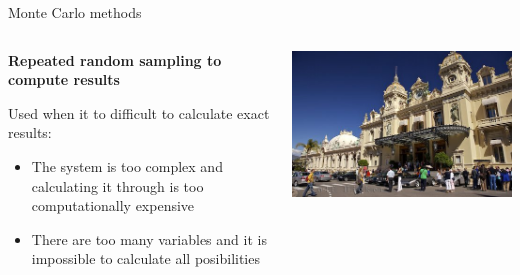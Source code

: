 \documentclass[compress]{beamer}
\begin{document}
\begin{frame}{Monte Carlo methods}

    \begin{columns}
        \begin{column}{0.5\linewidth}
            \textbf{Repeated random sampling to compute results}

            Used when it to difficult to calculate exact results:

            \begin{itemize}
                \item The system is too complex and calculating it through is too
                    computationally expensive
                \item There are too many variables and it is impossible to calculate all
                    posibilities
            \end{itemize}


        \end{column}
        \begin{column}{0.5\linewidth}
            \begin{center}
                \includegraphics[width=\linewidth]{montecarlo}
            \end{center}

        \end{column}
    \end{columns}

\end{frame}

\end{document}
